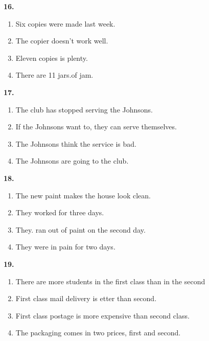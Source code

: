 \documentclass[12pt]{article}
\begin{document}
\par
\vspace{0.25\baselineskip}
\noindent\textbf{16.}
\begin{enumerate}[label=(\Alph*),leftmargin=*,itemsep=0.2em]
\item Six copies were made last week.
\item The copier doesn't work well.
\item Eleven copies is plenty.
\item There are 11 jars.of jam.
\end{enumerate}
\par
\vspace{0.25\baselineskip}
\noindent\textbf{17.}
\begin{enumerate}[label=(\Alph*),leftmargin=*,itemsep=0.2em]
\item The club has stopped serving the Johnsons.
\item If the Johnsons want to, they can serve themselves.
\item The Johnsons think the service is bad.
\item The Johnsons are going to the club.
\end{enumerate}
\par
\vspace{0.25\baselineskip}
\noindent\textbf{18.}
\begin{enumerate}[label=(\Alph*),leftmargin=*,itemsep=0.2em]
\item The new paint makes the house look clean.
\item They worked for three days.
\item They. ran out of paint on the second day.
\item They were in pain for two days.
\end{enumerate}
\par
\vspace{0.25\baselineskip}
\noindent\textbf{19.}
\begin{enumerate}[label=(\Alph*),leftmargin=*,itemsep=0.2em]
\item There are more students in the first class than in the second
\item First class mail delivery is etter than second.
\item First class postage is more expensive than second class.
\item The packaging comes in two prices, first and second.
\end{enumerate}
\par
\vspace{0.25\baselineskip}
\end{document}

